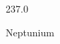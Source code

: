 \documentclass[12pt]{article}
\begin{document}
\hfill{}
\vfill
\begin{center}
  {\fontsize{50}{60}
  }

  \vspace{1em}

  237.0

Neptunium
\end{center}
\vfill
\end{document}
